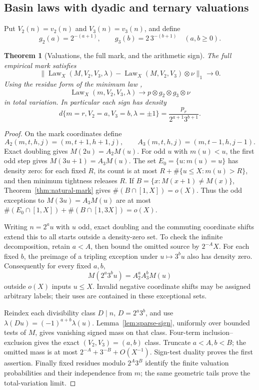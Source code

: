 \documentclass[11pt]{amsart}
\newtheorem{theorem}{Theorem}[section]
\theoremstyle{definition}
\theoremstyle{remark}
\begin{document}
\subsection{Basin laws with dyadic and ternary valuations}
Put $V_2(n)=v_2(n)$ and $V_3(n)=v_3(n)$, and define
\[
 g_2(a)=2^{-(a+1)},\qquad g_3(b)=2\,3^{-(b+1)}\quad(a,b\ge0).
\]
\begin{theorem}[Valuations, the full mark, and the arithmetic sign]\label{thm:valuation-sign}
The full empirical mark satisfies
\[
 \|\operatorname{Law}_X(M,V_2,V_3,\lambda)
       -\operatorname{Law}_X(M,V_2,V_3)\otimes\nu\|_1\to0.
\]
Using the residue form of the minimum law \cite[Theorem~3]{BM},
\[
 \operatorname{Law}_X(m,V_2,V_3,\lambda)
       \longrightarrow p\otimes g_2\otimes g_3\otimes\nu
\]
in total variation. In particular each sign has density
\[
 d\{m=r,V_2=a,V_3=b,\lambda=\pm1\}
       =\frac{p_r}{2^{a+1}3^{b+1}}.
\]
\end{theorem}
\begin{proof}
On the mark coordinates define
\[
 A_2(m,t,h,j)=(m,t+1,h+1,j),\qquad
 A_3(m,t,h,j)=(m,t-1,h,j-1).
\]
Exact doubling gives $M(2u)=A_2M(u)$. For odd $u$ with $m(u)<u$, the first odd step gives $M(3u+1)=A_3M(u)$. The set $E_0=\{u:m(u)=u\}$ has density zero: for each fixed $R$, its count is at most $R+\#\{u\le X:m(u)>R\}$, and then minimum tightness releases $R$. If $B=\{x:M(x+1)\ne M(x)\}$, Theorem~\ref{thm:natural-mark} gives $\#(B\cap[1,X])=o(X)$. Thus the odd exceptions to $M(3u)=A_3M(u)$ are at most $\#(E_0\cap[1,X])+\#(B\cap[1,3X])=o(X)$.

Writing $n=2^a u$ with $u$ odd, exact doubling and the commuting coordinate shifts extend this to all starts outside a density-zero set. To check the infinite decomposition, retain $a<A$, then bound the omitted source by $2^{-A}X$. For each fixed $b$, the preimage of a tripling exception under $u\mapsto3^b u$ also has density zero. Consequently for every fixed $a,b$,
\[
 M(2^a3^b u)=A_2^aA_3^b M(u)
\]
outside $o(X)$ inputs $u\le X$. Invalid negative coordinate shifts may be assigned arbitrary labels; their uses are contained in these exceptional sets.

Reindex each divisibility class $D\mid n$, $D=2^a3^b$, and use $\lambda(Du)=(-1)^{a+b}\lambda(u)$. Lemma~\ref{lem:sparse-sign}, uniformly over bounded tests of $M$, gives vanishing signed mass on that class. Four-term inclusion--exclusion gives the exact $(V_2,V_3)=(a,b)$ class. Truncate $a<A,b<B$; the omitted mass is at most $2^{-A}+3^{-B}+O(X^{-1})$. Sign-test duality proves the first assertion. Finally fixed residues modulo $2^A3^B$ identify the finite valuation probabilities and their independence from $m$; the same geometric tails prove the total-variation limit.
\end{proof}
\end{document}
